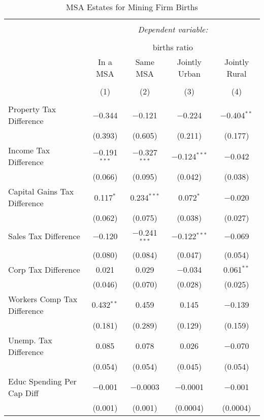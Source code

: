 
\begin{table}[!htbp] \centering 
  \caption{MSA Estates for  Mining Firm Births} 
  \label{21metro} 
\begin{tabular}{@{\extracolsep{5pt}}lcccc} 
\\[-1.8ex]\hline 
\hline \\[-1.8ex] 
 & \multicolumn{4}{c}{\textit{Dependent variable:}} \\ 
\cline{2-5} 
\\[-1.8ex] & \multicolumn{4}{c}{births ratio} \\ 
 & In a MSA & Same MSA & Jointly Urban & Jointly Rural \\ 
\\[-1.8ex] & (1) & (2) & (3) & (4)\\ 
\hline \\[-1.8ex] 
 Property Tax Difference & $-$0.344 & $-$0.121 & $-$0.224 & $-$0.404$^{**}$ \\ 
  & (0.393) & (0.605) & (0.211) & (0.177) \\ 
  Income Tax Difference & $-$0.191$^{***}$ & $-$0.327$^{***}$ & $-$0.124$^{***}$ & $-$0.042 \\ 
  & (0.066) & (0.095) & (0.042) & (0.038) \\ 
  Capital Gains Tax Difference & 0.117$^{*}$ & 0.234$^{***}$ & 0.072$^{*}$ & $-$0.020 \\ 
  & (0.062) & (0.075) & (0.038) & (0.027) \\ 
  Sales Tax Difference & $-$0.120 & $-$0.241$^{***}$ & $-$0.122$^{***}$ & $-$0.069 \\ 
  & (0.080) & (0.084) & (0.047) & (0.054) \\ 
  Corp Tax Difference & 0.021 & 0.029 & $-$0.034 & 0.061$^{**}$ \\ 
  & (0.046) & (0.070) & (0.028) & (0.025) \\ 
  Workers Comp Tax Difference & 0.432$^{**}$ & 0.459 & 0.145 & $-$0.139 \\ 
  & (0.181) & (0.289) & (0.129) & (0.159) \\ 
  Unemp. Tax Difference & 0.085 & 0.078 & 0.026 & $-$0.070 \\ 
  & (0.054) & (0.054) & (0.045) & (0.054) \\ 
  Educ Spending Per Cap Diff & $-$0.001 & $-$0.0003 & $-$0.0001 & $-$0.001 \\ 
  & (0.001) & (0.001) & (0.0004) & (0.0004) \\ 

\end{tabular}
\end{table}

